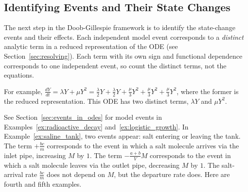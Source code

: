 \subsection{Identifying Events and Their State Changes}\label{subsec:events}


The next step in the Doob-Gillespie framework is to identify the state-change events and their effects. Each independent model event corresponds to a \textit{distinct} analytic term in a reduced representation of the ODE (see Section~\ref{sec:resolving}). Each term with its own sign and functional dependence corresponds to one independent event, so count the distinct terms, not the equations.

For example, $\frac{dY}{dt} = \lambda Y + \mu Y^2 = \frac{\lambda}{2}Y + \frac{\lambda}{2}Y + \frac{\mu}{3}Y^2 + \frac{\mu}{3}Y^2 + \frac{\mu}{3}Y^2$, where the former is the reduced representation. This ODE has two distinct terms, $\lambda Y$ and $\mu Y^2$.

See Section~\ref{sec:events_in_odes} for model events in Examples~\ref{ex:radioactive_decay} and~\ref{ex:logistic_growth}. In Example~\ref{ex:saline_tank}, two events appear: salt entering or leaving the tank. The term $+\frac{bc}{m}$ corresponds to the event in which a salt molecule arrives via the inlet pipe, increasing $M$ by $1$. The term $-\frac{a+b}{V} M$ corresponds to the event in which a salt molecule leaves via the outlet pipe, decreasing $M$ by $1$. The salt-arrival rate $\frac{bc}{m}$ does not depend on $M$, but the departure rate does. Here are fourth and fifth examples.


